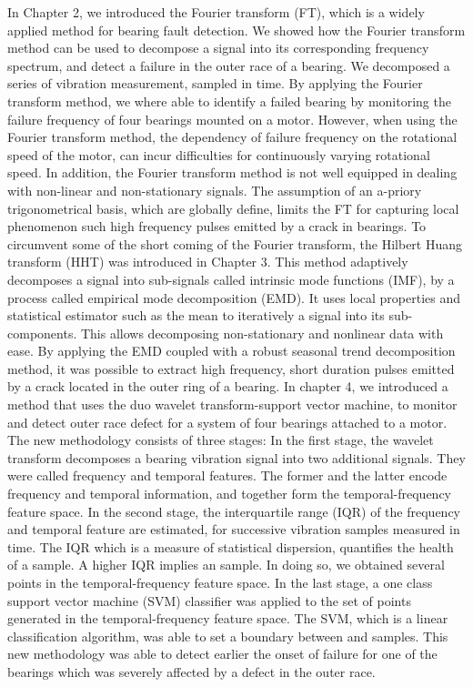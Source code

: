 \documentclass[thesis.tex]{subfiles}
\begin{document}
	\clearpage
	\justify
	In Chapter 2, we introduced the Fourier transform (FT), which is a widely applied method for bearing fault detection. We showed how the Fourier transform method can be used to decompose a signal into its corresponding frequency spectrum, and detect a failure in the outer race of a bearing. We decomposed a series of vibration measurement, sampled in time. By applying the Fourier transform method, we where able to identify a failed bearing by monitoring the failure frequency of four bearings mounted on a motor.
	\justify
	However, when using the Fourier transform method, the dependency of failure frequency on the rotational speed of the motor, can incur difficulties for continuously varying rotational speed. In addition, the Fourier transform method is not well equipped in dealing with non-linear and non-stationary signals. The assumption of an a-priory trigonometrical basis, which are globally define, limits the FT for capturing local phenomenon such high frequency pulses emitted by a crack in bearings.
	\justify
	To circumvent some of the short coming of the Fourier transform, the Hilbert Huang transform (HHT) was introduced in Chapter 3.
	This method adaptively decomposes a signal into sub-signals called intrinsic mode functions (IMF), by a process called empirical mode decomposition (EMD). It uses local properties and statistical estimator such as the mean to iteratively
	 a signal into its sub-components. This allows decomposing non-stationary and nonlinear data with ease.
	By applying the EMD coupled with a robust seasonal trend decomposition method, it was possible to extract high frequency, short duration pulses emitted by a crack located in the outer ring of a bearing.
	\justify
	In chapter 4, we introduced a method that uses the duo wavelet transform-support vector machine, to monitor and detect outer race defect for a system of four bearings attached to a motor. The new methodology consists of three stages: In the first stage, the wavelet transform decomposes a bearing vibration signal into two additional signals. They were called frequency and temporal features. The former and the latter encode frequency and temporal information, and together form the temporal-frequency feature space. In the second stage, the interquartile range (IQR) of the frequency and temporal feature are estimated, for successive vibration samples measured in time. The IQR which is a measure of statistical dispersion, quantifies the health of a sample. A higher IQR implies an  sample. In doing so, we obtained several points in the temporal-frequency feature space.
	\justify
	In the last stage, a one class support vector machine (SVM) classifier was applied to the set of points generated in the temporal-frequency feature space. The SVM, which is a linear classification algorithm, was able to set a boundary between  and  samples.
	This new methodology was able to detect earlier the onset of failure for one of the bearings which was severely affected by a defect in the outer race.
	
\end{document}
